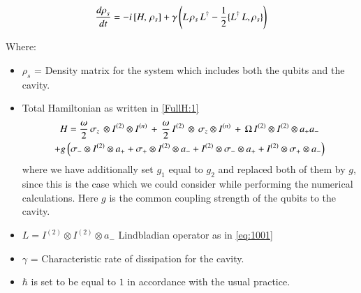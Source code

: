 \begin{equation}\label{eq:1002}
\frac { {d\rho}_{s}}{dt} = -{ i\thinspace } [{ H },\thinspace { \rho  }_{ s }] +\gamma \left({ { L }\thinspace{ \rho}_{ s } }\thinspace { L }^{ \dagger  }-\frac { 1 }{ 2 } \{ { L }^{ \dagger}\thinspace{L},{\rho  }_{ s }\}\right)
\end{equation}

Where:
\begin{itemize}
\item $\rho_{s}$ = Density matrix for the system which includes both the qubits and the cavity.
\item  Total Hamiltonian as written in \eqref{FullH:1}\begin{multline}\notag
H =\frac{\omega}{2}\thinspace{\sigma}_{z}\thinspace\otimes I^{(2)}\otimes{I^{(n)}}\thinspace +\thinspace\frac{\omega}{2}\thinspace{I^{(2)}}\thinspace\otimes\thinspace{\sigma}_{z}\otimes{I^{(n)}}\thinspace+\thinspace\Omega\thinspace I^{(2)}\otimes I^{(2)}\otimes{a}_{+}{a}_{- } \\
+ g \left({\sigma  }_{ - }\otimes I^{(2)}\otimes { a }_{ + } + { \sigma }_{+}\otimes I^{(2)}\otimes{a}_{ - }
+ I^{(2)}\otimes { \sigma  }_{ - }\otimes { a }_{ + }+I^{(2)}\otimes { \sigma  }_{ + }\otimes { a }_{ - }\right)
\end{multline} where we have additionally set $g_{1}$ equal to $g_{2}$ and replaced both of them by $g$, since this is the case which we could consider while performing the numerical calculations. Here $g$ is the common coupling strength of the qubits to the cavity.
\item $ {L} = I^{(2)} \otimes I^{(2)} \otimes {a}_{-} $  Lindbladian operator as in \eqref{eq:1001}
\item $\gamma$ = Characteristic rate of dissipation for the cavity. 
\item $\hbar$ is set to be equal to $1$ in accordance with the usual practice. 
\end{itemize}




